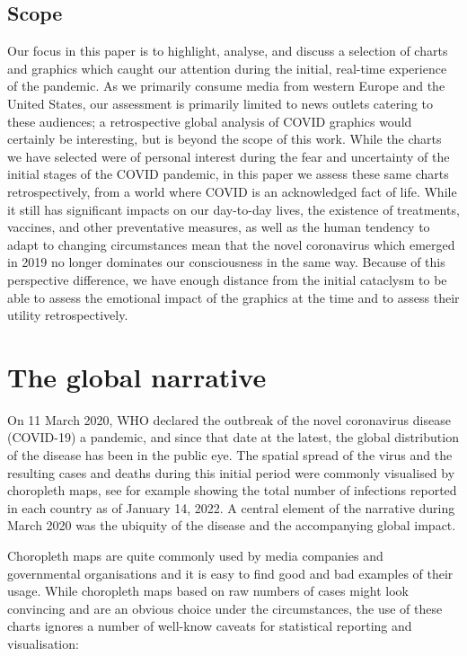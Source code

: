 \documentclass[article]{jdssv}\usepackage[]{graphicx}\usepackage[]{color}
\begin{document}
\subsection{Scope}
Our focus in this paper is to highlight, analyse, and discuss a selection of charts and graphics which caught our attention during the initial, real-time experience of the pandemic. As we primarily consume media from western Europe and the United States, our assessment is primarily limited to news outlets catering to these audiences; a retrospective global analysis of COVID graphics would certainly be interesting, but is beyond the scope of this work. While the charts we have selected were of personal interest during the fear and uncertainty of the initial stages of the COVID pandemic, in this paper we assess these same charts retrospectively, from a world where COVID is an acknowledged fact of life. While it still has significant impacts on our day-to-day lives, the existence of treatments, vaccines, and other preventative measures, as well as the human tendency to adapt to changing circumstances mean that the novel coronavirus which emerged in 2019 no longer dominates our consciousness in the same way. Because of this perspective difference, we have enough distance from the initial cataclysm to be able to assess the emotional impact of the graphics at the time and to assess their utility retrospectively.


\section{The global narrative}

On 11 March 2020, WHO declared the outbreak of the novel coronavirus disease (COVID-19) a pandemic, and since that date at the latest, the global distribution of the disease has been in the public eye. The spatial spread of the virus and the resulting cases and deaths during this initial period were commonly visualised by choropleth maps, see for example  showing the total number of infections reported in each country as of January 14, 2022. A central element of the narrative during March 2020 was the ubiquity of the disease and the accompanying global impact. 


Choropleth maps are quite commonly used by media companies and governmental organisations and it is easy to find good and bad examples of their usage. 
While choropleth maps based on raw numbers of cases might look convincing and are an obvious choice under the circumstances, the use of these charts ignores a number of well-know caveats for statistical reporting and visualisation:
\end{document}
